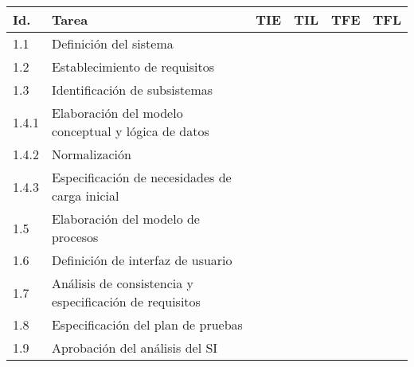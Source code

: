 \documentclass[11pt,a4paper,spanish,twoside]{report}
\begin{document}
{\begin{table}[!h]
\centering
   \begin{tabular}{|p{0.8cm}||p{5cm}||p{1.5cm}|p{1.5cm}|p{1.5cm}|p{1.5cm}|}
     \hline
     \textbf{Id.} & \textbf{Tarea} & \textbf{TIE} & \textbf{TIL} &
     \textbf{TFE} & \textbf{TFL}\\
     \hline
      1.1 & Definición del sistema  &  &  &  &  \\
      \hline
      1.2 & Establecimiento de requisitos  &  &  &  &  \\
      \hline
      1.3 & Identificación de subsistemas  &  &  &  &  \\
      \hline
      1.4.1 & Elaboración del modelo conceptual y lógica de datos &  &  &  &  \\
      \hline
      1.4.2 & Normalización  &  &  &  &  \\
      \hline
      1.4.3 & Especificación de necesidades de carga inicial  &  &  &  &  \\
      \hline
      1.5 & Elaboración del modelo de procesos  &  &  &  &  \\
      \hline
      1.6 & Definición de interfaz de usuario  &  &  &  &  \\
      \hline
      1.7 & Análisis de consistencia y especificación de requisitos & & & &\\
      \hline
      1.8 & Especificación del plan de pruebas &  &  &  &\\
      \hline
      1.9 & Aprobación del análisis del SI &  &  &  &  \\
      \hline \hline


\end{tabular}
\end{table}}
\end{document}
